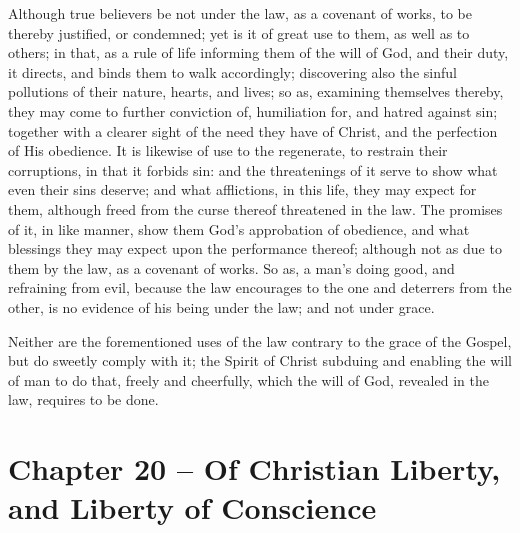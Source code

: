 \begin{outerlst}[left=0pt,labelsep=0pt]
\begin{innerlst}[resume*]
\item Although true believers be not under the law, as a covenant of works, to be thereby justified, or condemned; yet is it of great use to them, as well as to others; in that, as a rule of life informing them of the will of God, and their duty, it directs, and binds them to walk accordingly; discovering also the sinful pollutions of their nature, hearts, and lives; so as, examining themselves thereby, they may come to further conviction of, humiliation for, and hatred against sin; together with a clearer sight of the need they have of Christ, and the perfection of His obedience. It is likewise of use to the regenerate, to restrain their corruptions, in that it forbids sin: and the threatenings of it serve to show what even their sins deserve; and what afflictions, in this life, they may expect for them, although freed from the curse thereof threatened in the law. The promises of it, in like manner, show them God's approbation of obedience, and what blessings they may expect upon the performance thereof; although not as due to them by the law, as a covenant of works. So as, a man's doing good, and refraining from evil, because the law encourages to the one and deterrers from the other, is no evidence of his being under the law; and not under grace.   

\item Neither are the forementioned uses of the law contrary to the grace of the Gospel, but do sweetly comply with it; the Spirit of Christ subduing and enabling the will of man to do that, freely and cheerfully, which the will of God, revealed in the law, requires to be done.
\end{innerlst}

\item
{}
\section{Chapter 20 -- Of Christian Liberty, and Liberty of Conscience}
\begin{innerlst}[resume*]


\end{innerlst}
\end{outerlst}
